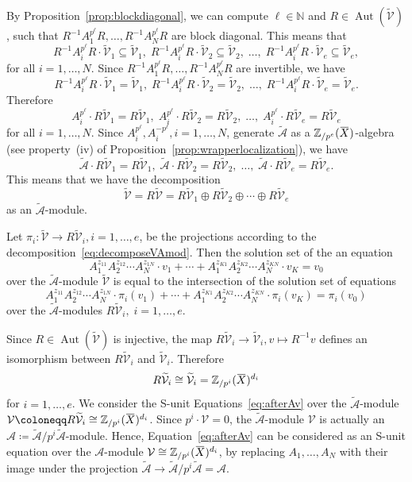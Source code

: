 \documentclass[letterpaper, 11pt, thm-restate]{article}
\numberwithin{equation}{section}
\newcommand{\N}{\mathbb{N}}
\newcommand{\Zpe}{\mathbb{Z}_{/p^e}}
\newcommand{\Zpi}{\mathbb{Z}_{/p^i}}
\newcommand{\Aut}{\operatorname{Aut}}
\newcommand{\mV}{\mathcal{V}}
\newcommand{\mA}{\mathcal{A}}
\newcommand{\tmA}{\widetilde{\mathcal{A}}}
\newcommand{\tmV}{\widetilde{\mathcal{V}}}
\newcommand{\oX}{\mkern 1.5mu\overline{\mkern-1.5mu X \mkern-1.5mu}\mkern 1.5mu}
\theoremstyle{definition}
\theoremstyle{definition}
\theoremstyle{definition}
\begin{document}
By Proposition~\ref{prop:blockdiagonal}, we can compute $\ell \in \N$ and $R \in \Aut(\tmV)$, such that $R^{-1}A_1^{p^{\ell}}R, \ldots, R^{-1}A_N^{p^{\ell}}R$ are block diagonal.
This means that
\[
R^{-1}A_i^{p^{\ell}}R \cdot \tmV_1 \subseteq \tmV_1, \; R^{-1}A_i^{p^{\ell}}R \cdot \tmV_2 \subseteq \tmV_2, \; \ldots, \; R^{-1}A_i^{p^{\ell}}R \cdot \tmV_e \subseteq \tmV_e,
\]
for all $i = 1, \ldots, N$.
Since $R^{-1}A_1^{p^{\ell}}R, \ldots, R^{-1}A_N^{p^{\ell}}R$ are invertible, we have
\[
R^{-1}A_i^{p^{\ell}}R \cdot \tmV_1 = \tmV_1, \; R^{-1}A_i^{p^{\ell}}R \cdot \tmV_2 = \tmV_2, \; \ldots, \; R^{-1}A_i^{p^{\ell}}R \cdot \tmV_e = \tmV_e.
\]
Therefore
\[
A_i^{p^{\ell}} \cdot R \tmV_1 = R \tmV_1, \; A_i^{p^{\ell}} \cdot R \tmV_2 = R \tmV_2, \; \ldots,\; A_i^{p^{\ell}} \cdot R \tmV_e = R \tmV_e
\]
for all $i = 1, \ldots, N$.
Since $A_i^{p^{\ell}}, A_i^{-p^{\ell}}, i = 1, \ldots, N$, generate $\tmA$ as a $\Zpe(\oX)$-algebra (see property~(iv) of Proposition~\ref{prop:wrapperlocalization}), we have
\[
\tmA \cdot R \tmV_1 = R \tmV_1,\; \tmA \cdot R \tmV_2 = R \tmV_2,\; \ldots,\; \tmA \cdot R \tmV_e = R \tmV_e.
\]
This means that we have the decomposition
\begin{equation}\label{eq:decomposeVAmod}
\tmV = R \tmV = R\tmV_1 \oplus R\tmV_2 \oplus \cdots \oplus R\tmV_e
\end{equation}
as an $\tmA$-module.

Let $\pi_i \colon \tmV \rightarrow R \tmV_i, i = 1, \ldots, e$, be the projections according to the decomposition~\eqref{eq:decomposeVAmod}.
Then the solution set of the an equation
\begin{equation}\label{eq:beforeAv}
     A_1^{z_{11}} A_2^{z_{12}} \cdots A_N^{z_{1N}} \cdot v_1 + \cdots + A_1^{z_{K1}} A_2^{z_{K2}} \cdots A_N^{z_{KN}} \cdot v_K = v_0
\end{equation}
over the $\tmA$-module $\tmV$ is equal to the intersection of the solution set of equations
\begin{equation}\label{eq:afterAv}
A_1^{z_{11}} A_2^{z_{12}} \cdots A_N^{z_{1N}} \cdot \pi_i(v_1) + \cdots + A_1^{z_{K1}} A_2^{z_{K2}} \cdots A_N^{z_{KN}} \cdot \pi_i(v_K) = \pi_i(v_0)
\end{equation}
over the $\tmA$-modules $R\tmV_i,\; i = 1, \ldots, e$.

Since $R \in \Aut(\tmV)$ is injective, the map $R\tmV_i \rightarrow \tmV_i, v \mapsto R^{-1}v$ defines an isomorphism between $R\tmV_i$ and $\tmV_i$.
Therefore
\[
R\tmV_i \cong \tmV_i = \Zpi(\oX)^{d_i}
\]
for $i = 1, \ldots, e$.
We consider the S-unit Equations~\eqref{eq:afterAv} over the $\tmA$-module $\mV \coloneqq R\tmV_i \cong \Zpi(\oX)^{d_i}$.
Since $p^i \cdot \mV = 0$, the $\tmA$-module $\mV$ is actually an $\mA \coloneqq \tmA/p^i \tmA$-module.
Hence, Equation~\eqref{eq:afterAv} can be considered as an S-unit equation over the $\mA$-module $\mV \cong \Zpi(\oX)^{d_i}$, by replacing $A_1, \ldots, A_N$ with their image under the projection $\tmA \rightarrow \tmA/p^i \tmA = \mA$.
\end{document}
